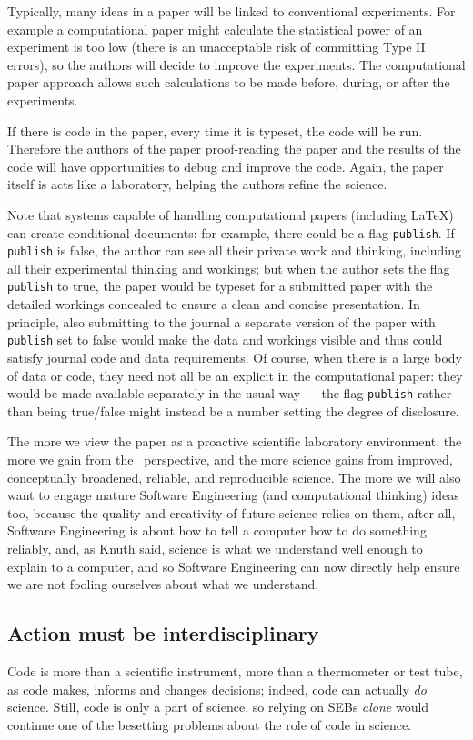 \documentclass{comjnl}
\begin{document}
Typically, many ideas in a paper will be linked to conventional experiments. For example a computational paper might calculate the statistical power of an experiment is too low (there is an unacceptable risk of committing Type II errors), so the authors will decide to improve the experiments. The computational paper approach allows such calculations to be made before, during, or after the experiments.

If there is code in the paper, every time it is typeset, the code will be run. Therefore the authors of the paper proof-reading the paper and the results of the code will have opportunities to debug and improve the code. Again, the paper itself is acts like a laboratory, helping the authors refine the science.

Note that systems capable of handling computational papers (including \LaTeX) can create conditional documents: for example, there could be a flag \texttt{publish}. If \texttt{publish} is false, the author can see all their private work and thinking, including all their experimental thinking and workings; but when the author sets the flag \texttt{publish} to true, the paper would be typeset for a submitted paper with the detailed workings concealed to ensure a clean and concise presentation. In principle, also submitting to the journal a separate version of the paper with \texttt{publish} set to false would make the data and workings visible and thus could satisfy journal code and data requirements. Of course, when there is a large body of data or code, they need not all be an explicit in the computational paper: they would be made available separately in the usual way --- the flag \texttt{publish} rather than being true/false might instead be a number setting the degree of disclosure.

The more we view the paper as a proactive scientific laboratory environment, the more we gain from the \RAPstar\ perspective, and the more science gains from improved, conceptually broadened, reliable, and reproducible science. The more we will also want to engage mature Software Engineering (and computational thinking) ideas too, because the quality and creativity of future science relies on them, after all, Software Engineering is about how to tell a computer how to do something reliably, and, as Knuth said, science is what we understand well enough to explain to a computer, and so Software Engineering can now directly help ensure we are not fooling ourselves about what we understand.

\subsection{Action must be interdisciplinary}
Code is more than a scientific instrument, more than a thermometer or test tube, as code makes, informs and changes decisions; indeed, code can actually \emph{do\/} science. Still, code is only a part of science, so relying on SEBs \emph{alone\/} would continue one of the besetting problems about the role of code in science. 
\end{document}
